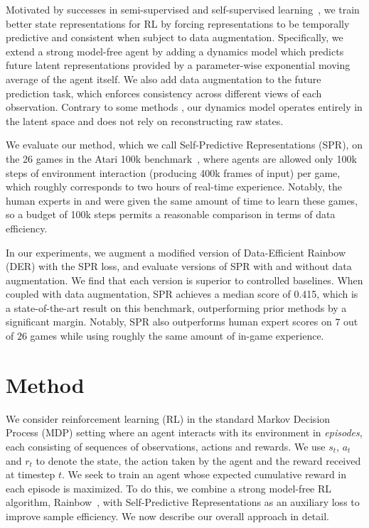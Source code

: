 Motivated by successes in semi-supervised and self-supervised learning~\citep{tarvainen2017mean, uda, BYOL}, we train better state representations for RL by forcing representations to be temporally predictive and consistent when subject to data augmentation. Specifically, we extend a strong model-free agent by adding a dynamics model which predicts future latent representations provided by a parameter-wise exponential moving average of the agent itself. We also add data augmentation to the future prediction task, which enforces consistency across different views of each observation. Contrary to some methods \citep{simple, hafner2019learning}, our dynamics model operates entirely in the latent space and does not rely on reconstructing raw states.

We evaluate our method, which we call Self-Predictive Representations (SPR), on the 26 games in the Atari 100k benchmark~\citep{simple}, where agents are allowed only 100k steps of environment interaction (producing 400k frames of input) per game, which roughly corresponds to two hours of real-time experience. Notably, the human experts in \citet{dqn} and \citet{doubledqn} were given the same amount of time to learn these games, so a budget of 100k steps permits a reasonable comparison in terms of data efficiency.

In our experiments, we augment a modified version of Data-Efficient Rainbow (DER) \citep{der} with the SPR loss, and evaluate versions of SPR with and without data augmentation. We find that each version is superior to controlled baselines. When coupled with data augmentation, SPR achieves a median score of 0.415, which is a state-of-the-art result on this benchmark, outperforming prior methods by a significant margin. Notably, SPR also outperforms human expert scores on $7$ out of $26$ games while using roughly the same amount of in-game experience.

\section{Method}
We consider reinforcement learning (RL) in the standard Markov Decision Process (MDP) setting where an agent interacts with its environment in \textit{episodes}, each consisting of sequences of observations, actions and rewards.  We use $s_t$, $a_t$ and $r_t$ to denote the state, the action taken by the agent and the reward received at timestep $t$. We seek to train an agent whose expected cumulative reward in each episode is maximized.
To do this, we combine a strong model-free RL algorithm, Rainbow~\citep{hessel2018rainbow}, with Self-Predictive Representations as an auxiliary loss to improve sample efficiency. We now describe our overall approach in detail.

